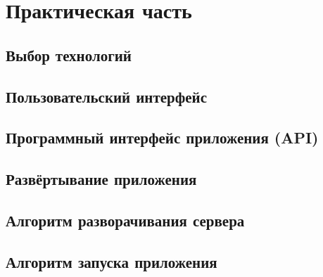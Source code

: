 \documentclass[14pt,a4paper]{scrartcl}
\begin{document}
    \newpage
    \section[Практическая часть]{Практическая часть}
    \subsection[Выбор технологий]{Выбор технологий}
    \subsection[Пользовательский интерфейс]{Пользовательский интерфейс}
    \subsection[Программный интерфейс приложения]{Программный интерфейс приложения (API)}
    \subsection[Развёртывание приложения]{Развёртывание приложения}
    \subsection[Алгоритм разворачивания сервера]{Алгоритм разворачивания сервера}
    \subsection[Алгоритм запуска приложения]{Алгоритм запуска приложения}

    \newpage
\end{document}
